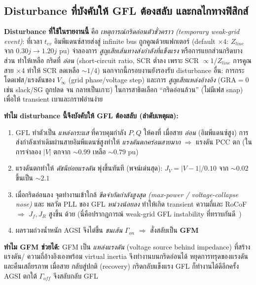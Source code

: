 \documentclass[12pt,a4paper]{article}
\begin{document}
\subsection{Disturbance ที่บังคับให้ GFL ต้องสลับ และกลไกทางฟิสิกส์}
\label{sec:disturb}
\textbf{Disturbance ที่ใช้ในรายงานนี้} คือ \emph{เหตุการณ์กริดอ่อนตัวชั่วคราว (temporary weak-grid event)}:
ที่เวลา $t_{ev}$ อิมพีแดนซ์สายส่งสู่ infinite bus ถูกคูณด้วยแฟกเตอร์ (default $\times4$: $Z_{line}$ จาก
$0.30j\to1.20j$ pu) จำลองการ \emph{สูญเสียเส้นทางส่งกำลังที่แข็งแรง} หรือการแยกส่วนกริดบางส่วน ทำให้เหลือ
กริดที่ \emph{อ่อน} (short-circuit ratio, SCR ต่ำลง เพราะ SCR $\propto 1/Z_{line}$ การคูณสาย $\times4$ ทำให้
SCR ลดเหลือ $\sim1/4$) นอกจากนี้กรอบงานยังรองรับ disturbance อื่น: การกระโดดเฟส/แรงดันของ $V_\infty$
(grid phase/voltage step) และการ \emph{สูญเสียแหล่งอ้างอิง} ($\mathrm{GRA}=0$ เช่น slack/SG ถูกปลด จน
กลายเป็นเกาะ) ในการสาธิตเลือก ``กริดอ่อนล้วน'' (ไม่มีเฟส snap) เพื่อให้ transient เบาและกราฟอ่านง่าย

\textbf{ทำไม disturbance นี้จึงบังคับให้ GFL ต้องสลับ (ลำดับเหตุผล):}
\begin{enumerate}
\item GFL ทำตัวเป็น \emph{แหล่งกระแส} ที่ควบคุมกำลัง $P,Q$ ให้คงที่ เมื่อสาย \emph{อ่อน} (อิมพีแดนซ์สูง)
การส่งกำลังเท่าเดิมผ่านสายอิมพีแดนซ์สูงทำให้ \emph{แรงดันตกคร่อมสายมาก} $\Rightarrow$ แรงดัน PCC ตก
(ในการจำลอง $\lvert V\rvert$ ตกจาก $\sim0.99$ เหลือ $\sim0.79$ pu)
\item แรงดันตกทำให้ \emph{ดัชนีย่อยแรงดัน} พุ่งขึ้นทันที (พจน์เด่นสุด):
$J_V=\lvert V-1\rvert/0.10$ จาก $\sim0.02$ ขึ้นเป็น $\sim2.1$
\item เมื่อกริดอ่อนลง จุดทำงานเข้าใกล้ \emph{ขีดจำกัดกำลังสูงสุด (max-power / voltage-collapse nose)} และ
พลวัต PLL ของ GFL \emph{หน่วงน้อยลง} ทำให้เกิด transient ความถี่และ RoCoF $\Rightarrow$ $J_f, J_R$ สูงขึ้น
ด้วย (นี่คือปรากฏการณ์ weak-grid GFL instability ที่ทราบกันดี~\cite{liu2024b})
\item ผลรวมถ่วงน้ำหนัก AGSI จึงไต่ขึ้น \emph{ชนเส้น} $\Gamma_{on}$ $\Rightarrow$ สั่งสลับเป็น \textbf{GFM}
\end{enumerate}

\textbf{ทำไม GFM ช่วยได้:} GFM เป็น \emph{แหล่งแรงดัน} (voltage source behind impedance) ที่สร้างแรงดัน/
ความถี่อ้างอิงเองพร้อม virtual inertia จึงทำงานบนกริดอ่อนได้ หยุดการทรุดของแรงดัน และคืนเสถียรภาพ เมื่อสาย
กลับสู่ปกติ (recovery) กริดกลับแข็งแรง GFL ก็ทำงานได้ดีอีกครั้ง AGSI ตกใต้ $\Gamma_{off}$ จึงสลับกลับ GFL
\end{document}
